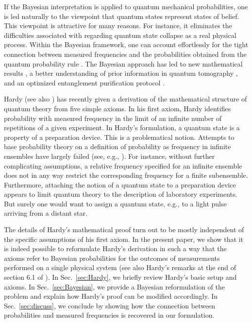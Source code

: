 \documentclass[pra,12pt,tightenlines]{revtex4}
\begin{document}
If the Bayesian interpretation is applied to quantum mechanical probabilities,
one is led naturally to the viewpoint that quantum states represent states of
belief. This viewpoint is attractive for many reasons. For instance, it
eliminates the difficulties associated with regarding quantum state collapse
as a real physical process. Within the Bayesian framework, one can account
effortlessly for the tight connection between measured frequencies and the
probabilities obtained from the quantum probability rule \cite{Caves2002c}.
The Bayesian approach has led to new mathematical results
\cite{Caves2002b,Caves2002a}, a better understanding of prior information in
quantum tomography \cite{Schack2001a}, and an optimized entanglement
purification protocol \cite{Brun2001a}.

Hardy \cite{Hardy-0101} (see also \cite{Hardy-0111}) has recently given a
derivation of the mathematical structure of quantum theory from five simple
axioms. In his first axiom, Hardy identifies probability with measured
frequency in the limit of an infinite number of repetitions of a given
experiment. In Hardy's formulation, a quantum state is a property of a
preparation device. This is a problematical notion. Attempts to base
probability theory on a definition of probability as frequency in infinite
ensembles \cite{VonMises1957} have largely failed (see, e.g.,
\cite{vanFraassen1977,Jaynes2003}). For instance,
without further complicating assumptions, a relative frequency specified for
an infinite ensemble does not in any way restrict the corresponding frequency
for a finite subensemble. Furthermore, attaching the notion of a quantum state
to a preparation device appears to limit quantum theory to the description of
laboratory experiments. But surely one would want to assign a quantum state,
e.g., to a light pulse arriving from a distant star.

The details of Hardy's mathematical proof turn out to be mostly independent of
the specific assumptions of his first axiom. In the present paper, we show
that it is indeed possible to reformulate Hardy's derivation in such a way
that the axioms refer to Bayesian probabilities for the outcomes of
measurements performed on a single physical system (see also Hardy's remarks
at the end of section 6.1 of \cite{Hardy-0101}). In Sec.~\ref{sec:Hardy}, we
briefly review Hardy's basic setup and axioms. In Sec.~\ref{sec:Bayesian}, we
provide a Bayesian reformulation of the problem and explain how Hardy's proof
can be modified accordingly. In Sec.~\ref{sec:discuss}, we conclude by showing
how the connection between probabilities and measured frequencies is
recovered in our formulation.
\end{document}
